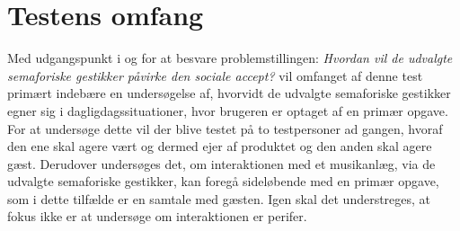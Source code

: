 \section{Testens omfang}
\label{TestensOmfangSocialAccept}
%
Med udgangspunkt i og for at besvare problemstillingen: \textit{Hvordan vil de udvalgte semaforiske gestikker påvirke den sociale accept?} vil omfanget af denne test primært indebære en undersøgelse af, hvorvidt de udvalgte semaforiske gestikker egner sig i dagligdagssituationer, hvor brugeren er optaget af en primær opgave. For at undersøge dette vil der blive testet på to testpersoner ad gangen, hvoraf den ene skal agere vært og dermed ejer af produktet og den anden skal agere gæst. Derudover undersøges det, om interaktionen med et musikanlæg, via de udvalgte semaforiske gestikker, kan foregå sideløbende med en primær opgave, som i dette tilfælde er en samtale med gæsten. Igen skal det understreges, at fokus ikke er at undersøge om interaktionen er perifer. 

